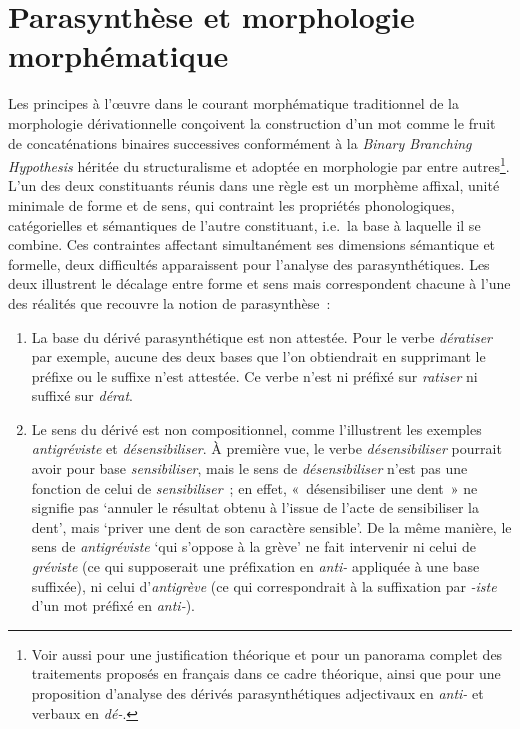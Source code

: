 \documentclass[output=paper]{langsci/langscibook}
\begin{document}
\section{Parasynthèse et morphologie morphématique}
\label{sec:MMM-parasynthetiques}

Les principes à l'œuvre dans le courant morphématique traditionnel de la morphologie dérivationnelle conçoivent la construction d'un mot comme le fruit de concaténations binaires successives conformément à la \emph{Binary Branching Hypothesis} héritée du structuralisme et adoptée en morphologie par \citet{Aronoff1976,booij1977.dutch-morphology} entre autres\footnote{Voir aussi \citet{guevara2007.IGG23} pour une justification théorique et \citet{heyna2014.etudes-parasynthetiques} pour un panorama complet des traitements proposés en français dans ce cadre théorique, ainsi que pour une proposition d'analyse des dérivés parasynthétiques adjectivaux en \emph{\mbox{anti-}} et verbaux en \emph{\mbox{dé-}}.}. L'un des deux constituants réunis dans une règle est un morphème affixal, unité minimale de forme et de sens, qui contraint les propriétés phonologiques, catégorielles et sémantiques de l'autre constituant, i.e.\ la base à laquelle il se combine. Ces contraintes affectant simultanément ses dimensions sémantique et formelle, deux difficultés apparaissent pour l'analyse des parasynthétiques.  Les deux illustrent le décalage entre forme et sens mais correspondent chacune à l'une des réalités que recouvre la notion de parasynthèse~:

\begin{enumerate}

\item {La base du dérivé parasynthétique  est non attestée.} 
 Pour le verbe  \emph{dératiser} par exemple, aucune des deux bases que l'on obtiendrait en supprimant le préfixe ou le suffixe n'est attestée.  Ce verbe n'est ni préfixé sur \emph{ratiser} ni suffixé sur \emph{dérat}.

\item {Le sens du dérivé est non compositionnel,} comme l'illustrent les exemples \emph{antigréviste} et \emph{désensibiliser}. À première vue, le verbe \emph{désensibiliser} pourrait avoir pour base \emph{sensibiliser}, mais  le sens de \emph{désensibiliser} n'est pas une fonction de celui de \emph{sensibiliser}~; en effet, «~désensibiliser une dent~» ne signifie pas  `annuler le résultat obtenu à l'issue de l'acte de sensibiliser la dent', mais `priver une dent de son caractère sensible'.  De la même manière, le sens de \emph{antigréviste} `qui s'oppose à la grève' ne fait intervenir ni celui de \emph{gréviste} (ce qui supposerait une préfixation en \emph{\mbox{anti-}} appliquée à une base suffixée), ni celui d'\emph{antigrève} (ce qui correspondrait  à la suffixation par \emph{\mbox{-iste}} d'un mot préfixé en \emph{\mbox{anti-}}).

\end{enumerate}
\end{document}
